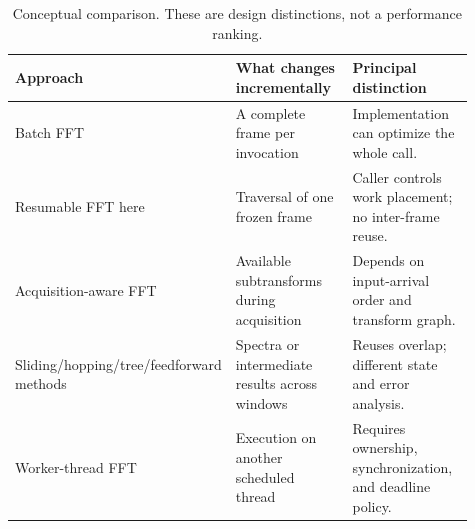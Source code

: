 \begin{table}[htbp]
\centering\small
\begin{tabular}{@{}>{\raggedright\arraybackslash}p{0.24\linewidth}>{\raggedright\arraybackslash}p{0.33\linewidth}>{\raggedright\arraybackslash}p{0.34\linewidth}@{}}
\toprule
Approach & What changes incrementally & Principal distinction \\
\midrule
Batch FFT & A complete frame per invocation & Implementation can optimize the whole call. \\
Resumable FFT here & Traversal of one frozen frame & Caller controls work placement; no inter-frame reuse. \\
Acquisition-aware FFT & Available subtransforms during acquisition & Depends on input-arrival order and transform graph. \\
Sliding/hopping/tree/\allowbreak feedforward methods & Spectra or intermediate results across windows & Reuses overlap; different state and error analysis. \\
Worker-thread FFT & Execution on another scheduled thread & Requires ownership, synchronization, and deadline policy. \\
\bottomrule
\end{tabular}
\caption{Conceptual comparison. These are design distinctions, not a performance ranking.}
\label{tab:position}
\end{table}
